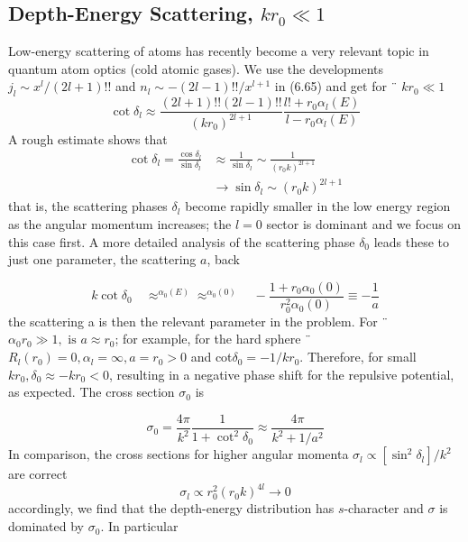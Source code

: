 \subsection{Depth-Energy Scattering, $kr_0\ll 1$}
Low-energy scattering of atoms has recently become a very relevant topic in quantum atom optics (cold atomic gases). We use the developments $j_l \sim x^l / (2l + 1) !!$ and $n_l \sim - (2l - 1) !! / x^{l + 1}$ in (6.65) and get for ¨ $kr_0\ll 1$
\begin{equation}
    \cot \delta_{l} \approx \frac{(2 l+1) ! !(2 l-1) ! !}{\left(k r_{0}\right)^{2 l+1}} \frac{l !+r_{0} \alpha_{l}(E)}{l-r_{0} \alpha_{l}(E)}
    \end{equation}
A rough estimate shows that
\begin{equation}
\begin{aligned} \cot \delta_{l}=\frac{\cos \delta_{l}}{\sin \delta_{l}} & \approx \frac{1}{\sin \delta_{l}} \sim \frac{1}{\left(r_{0} k\right)^{2 l+1}} \\ & \rightarrow \sin \delta_{l} \sim\left(r_{0} k\right)^{2 l+1} \end{aligned}
\end{equation}
that is, the scattering phases $\delta_l$ become rapidly smaller in the low energy region as the angular momentum increases; the $l = 0$ sector is dominant and we focus on this case first. A more detailed analysis of the scattering phase $\delta_0$ leads these to just one parameter, the scattering $a$, back

\begin{equation}
    k \cot \delta_{0} \quad \approx^{\alpha_{0}(E)} \approx^{\alpha_{0}(0)} \quad-\frac{1+r_{0} \alpha_{0}(0)}{r_{0}^{2} \alpha_{0}(0)} \equiv-\frac{1}{a}
    \end{equation}
the scattering a is then the relevant parameter in the problem. For ¨ $\alpha_0r_0\gg 1,\text{ is } a \approx r_0$; for example, for the hard sphere ¨$R_l (r_0) = 0, \alpha_l = \infty, a = r_0> 0$ and cot$ \delta_0 = -1 / kr_0$. Therefore, for small $kr_0, \delta_0 ≈ -kr_0 <0$, resulting in a negative phase shift for the repulsive potential, as expected. The cross section $\sigma_0$ is

\begin{equation}
    \sigma_{0}=\frac{4 \pi}{k^{2}} \frac{1}{1+\cot ^{2} \delta_{0}} \approx \frac{4 \pi}{k^{2}+1 / a^{2}}
    \end{equation}
In comparison, the cross sections for higher angular momenta $\sigma_l \propto [\operatorname{sin}^2\delta_l] / k^2$ are correct
\begin{equation}
    \sigma_{l} \propto r_{0}^{2}\left(r_{0} k\right)^{4 l} \rightarrow 0
    \end{equation}
accordingly, we find that the depth-energy distribution has $s$-character and $\sigma$ is dominated by $\sigma_0$. In particular


